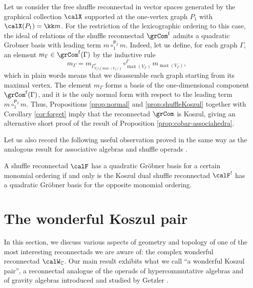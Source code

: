 \begin{exam}\label{ex:grCom}
Let us consider the free shuffle reconnectad in vector spaces generated by the graphical collection $\calX$ supported at the one-vertex graph $P_1$ with $\calX(P_1)=\kk m$. For the restriction of the lexicographic ordering to this case, the ideal of relations of the shuffle reconnectad $\grCom^{\mathrm{f}}$ admits a quadratic Grobner basis with leading term $m\circ_{1}^{\mathsf{P}_2}m$. Indeed, let us define, for each graph $\Gamma$, an element $m_\Gamma \in \grCom^{\mathrm{f}}(\Gamma)$ by the inductive rule 
 \[
m_\Gamma = m_{\Gamma^*_{V_\Gamma\setminus\{\max(V_\Gamma)\}}}\circ_{\max(V_\Gamma)}^{\Gamma} m_{\max(V_\Gamma)},
 \]
which in plain words means that we disassemble each graph starting from its maximal vertex. The element $m_\Gamma$ forms a basis of the one-dimensional component $\grCom^{\mathrm{f}}(\Gamma)$, and it is the only normal form with respect 
to the leading term $m\circ_{1}^{\mathsf{P}_2}m$. Thus, Propositions \ref{prop:normal} and \ref{prop:shuffleKoszul} together with Corollary \ref{cor:forget} imply that the reconnectad $\grCom$ is Koszul, giving an alternative short proof of the result of Proposition \ref{prop:cobar-associahedra}.
\end{exam}

Let us also record the following useful observation proved in the same way as the analogous result for associative algebras \cite[Th.~4.1]{MR2177131} and shuffle operads \cite[Th.~5.5]{MR2574993}.

\begin{prop}\label{prop:dualPBW}
A shuffle reconnectad $\calF$ has a quadratic Gr\"obner basis for a certain monomial ordering if and only is the Koszul dual shuffle reconnectad $\calF^!$ has a quadratic Gr\"obner basis for the opposite monomial ordering.  
\end{prop}

\section{The wonderful Koszul pair}\label{sec:wonderful}

In this section, we discuss various aspects of geometry and topology of one of the most interesting reconnectads we are aware of: the complex wonderful reconnectad $\calW_{\mathbb{C}}$. Our main result exhibits what we call ``a wonderful Koszul pair'', a reconnectad analogue of the operads of hypercommutative algebras and of gravity algebras introduced and studied by Getzler \cite{MR1284793,MR1363058}.

